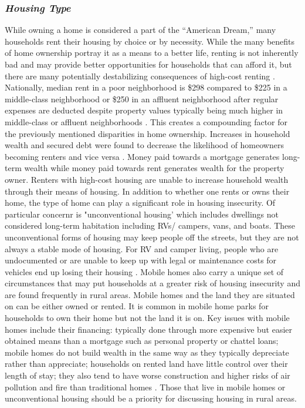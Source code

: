 \subsubsection{\textit{Housing Type}} 
While owning a home is considered a part of the “American Dream,” many households rent their housing by choice or by necessity. While the many benefits of home ownership portray it as a means to a better life, renting is not inherently bad and may provide better opportunities for households that can afford it, but there are many potentially destabilizing consequences of high-cost renting \citep{drew_believing_2014}. Nationally, median rent in a poor neighborhood is \$298 compared to \$225 in a middle-class neighborhood or \$250 in an affluent neighborhood after regular expenses are deducted despite property values typically being much higher in middle-class or affluent neighborhoods \citep{desmond_poor_2019}. This creates a compounding factor for the previously mentioned disparities in home ownership. Increases in household wealth and secured debt were found to decrease the likelihood of homeowners becoming renters and vice versa \citep{anderson_effect_2021}. Money paid towards a mortgage generates long-term wealth while money paid towards rent generates wealth for the property owner. Renters with high-cost housing are unable to increase household wealth through their means of housing.  In addition to whether one rents or owns their home, the type of home can play a significant role in housing insecurity. Of particular concernr is "unconventional housing' which includes dwellings not considered long-term habitation including RVs/ campers, vans, and boats. These unconventional forms of housing may keep people off the streets, but they are not always a stable mode of housing. For RV and camper living, people who are undocumented or are unable to keep up with legal or maintenance costs for vehicles end up losing their housing \citep{wakin_not_2005}. Mobile homes also carry a unique set of circumstances that may put households at a greater risk of housing insecurity and are found frequently in rural areas. Mobile homes and the land they are situated on can be either owned or rented. It is common in mobile home parks for households to own their home but not the land it is on. Key issues with mobile homes include their financing: typically done through more expensive but easier obtained means than a mortgage such as personal property or chattel loans; mobile homes do not build wealth in the same way as they typically depreciate rather than appreciate; households on rented land have little control over their length of stay; they also tend to have worse construction and higher risks of air pollution and fire than traditional homes \citep{mactavish_wrong_2007}. Those that live in mobile homes or unconventional housing should be a priority for discussing housing in rural areas. 


